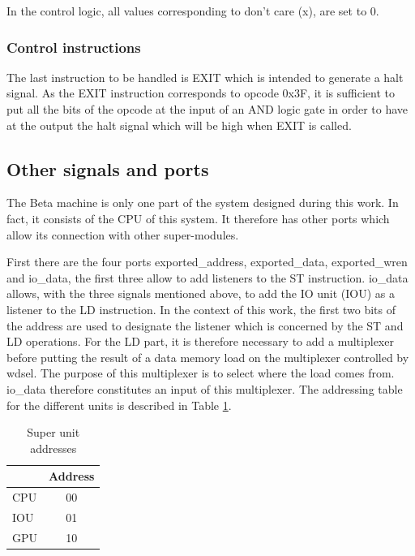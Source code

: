 In the control logic, all values corresponding to don't care (x), are set to 0. 

\subsubsection*{Control instructions}

The last instruction to be handled is EXIT which is intended to generate a halt signal. As the EXIT 
instruction corresponds to opcode 0x3F, it is sufficient to put all the bits of the opcode at the 
input of an AND logic gate in order to have at the output the halt signal which will be high when 
EXIT is called.

\subsection{Other signals and ports}

The Beta machine is only one part of the system designed during this work. In fact, it consists of the 
CPU of this system. It therefore has other ports which allow its connection with other super-modules. 

First there are the four ports exported\_address, exported\_data, exported\_wren and io\_data,
the first three allow to add listeners to the ST instruction. io\_data allows, with the 
three signals mentioned above, to add the IO unit (IOU) as a listener to the LD instruction. In the 
context of this work, the first two bits of the address are used to designate the listener which 
is concerned by the ST and LD operations. For the LD part, it is therefore necessary to add a 
multiplexer before putting the result of a data memory load on the multiplexer controlled by wdsel. 
The purpose of this multiplexer is to select where the load comes from. io\_data therefore 
constitutes an input of this multiplexer. The addressing table for the different units is described 
in Table \ref{tab:beta/address}. 

\begin{table}[H]
    \centering
    \begin{tabular}{|l|c|}
    \hline
    \rowcolor[HTML]{DAE8FC} 
    \multicolumn{1}{|c|}{\cellcolor[HTML]{DAE8FC}\textbf{Super unit}} & \textbf{Address} \\ \hline
    CPU                                                               & 00               \\ \hline
    IOU                                                               & 01               \\ \hline
    GPU                                                               & 10               \\ \hline
    \end{tabular}
    \caption{Super unit addresses}
    \label{tab:beta/address}
\end{table}

